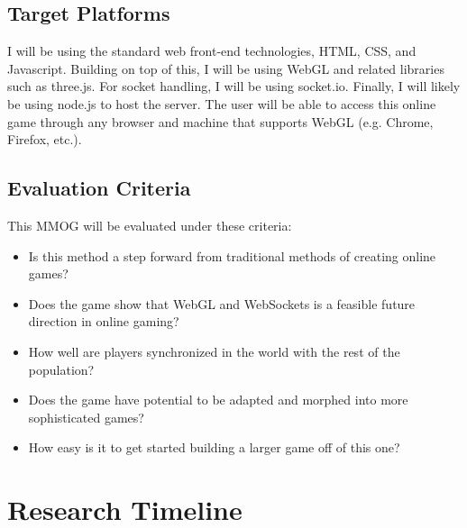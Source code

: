 \documentclass{acmsiggraph}
\begin{document}
    \subsection{Target Platforms}
    I will be using the standard web front-end technologies, HTML, CSS, and Javascript. Building on top of this, I will be using WebGL and related libraries such as three.js. For socket handling, I will be using socket.io. Finally, I will likely be using node.js to host the server. The user will be able to access this online game through any browser and machine that supports WebGL (e.g. Chrome, Firefox, etc.).\\

    \subsection{Evaluation Criteria}
    This MMOG will be evaluated under these criteria:
    \begin{itemize}
        \item{Is this method a step forward from traditional methods of creating online games?}
        \item{Does the game show that WebGL and WebSockets is a feasible future direction in online gaming?}
        \item{How well are players synchronized in the world with the rest of the population?}
        \item{Does the game have potential to be adapted and morphed into more sophisticated games?}
        \item{How easy is it to get started building a larger game off of this one?}
    \end{itemize}

\section{Research Timeline}

\end{document}

